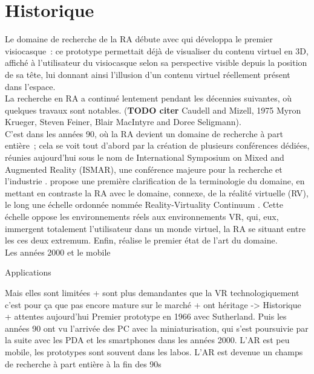 \section*{Historique}
Le domaine de recherche de la RA débute avec \cite{Sutherland1968} qui développa le premier visiocasque~: ce prototype permettait déjà de visualiser du contenu virtuel en 3D, affiché à l'utilisateur du visiocasque selon sa perspective visible depuis la position de sa tête, lui donnant ainsi l'illusion d'un contenu virtuel réellement présent dans l'espace. \\
La recherche en RA a continué lentement pendant les décennies suivantes, où quelques travaux sont notables. (\textbf{TODO citer} Caudell and Mizell, 1975 Myron Krueger, Steven Feiner, Blair MacIntyre and Doree Seligmann). \\
C'est dans les années 90, où la RA devient un domaine de recherche à part entière~; cela se voit tout d'abord par la création de plusieurs conférences dédiées, réunies aujourd'hui sous le nom de International Symposium on
Mixed and Augmented Reality (ISMAR), une conférence majeure pour la recherche et l'industrie \cite[]{VanKrevelenPoelman2010}. \cite{MilgramKishino1994} propose une première clarification de la terminologie du domaine, en mettant en contraste la RA avec le domaine, connexe, de la réalité virtuelle (RV), le long une échelle ordonnée nommée \foreignlanguage{english}{Reality-Virtuality Continuum} . Cette échelle oppose les environnements réels aux environnements VR, qui, eux, immergent totalement l'utilisateur dans un monde virtuel, la RA se situant entre les ces deux extremum. Enfin, \cite{Azuma1997} réalise le premier état de l'art du domaine. \\
Les années 2000 et le mobile


Applications \cite[]{VanKrevelenPoelman2010} \cite{CarmignianiFurhtAnisettiEtAl2011}

Mais elles sont limitées + sont plus demandantes que la VR technologiquement c'est pour ça que pas encore mature sur le marché + ont héritage -> Historique + attentes aujourd'hui
Premier prototype en 1966 avec Sutherland. Puis les années 90 ont vu l'arrivée des PC avec la miniaturisation, qui s'est poursuivie par la suite avec les PDA et les smartphones dans les années 2000. L'AR est peu mobile, les prototypes sont souvent dans les labos. L'AR est devenue un champs de recherche à part entière à la fin des 90s

